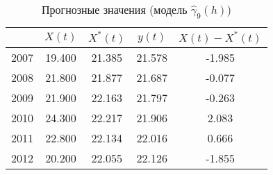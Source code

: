 \begin{table}[H]
\centering
\begin{tabular}{r|cccc}
  \hline
 & $X(t)$ & $X^{*}(t)$ & $y(t)$ & $ X(t) - X^{*}(t) $ \\ 
  \hline
2007 & 19.400 & 21.385 & 21.578 & -1.985 \\ 
  2008 & 21.800 & 21.877 & 21.687 & -0.077 \\ 
  2009 & 21.900 & 22.163 & 21.797 & -0.263 \\ 
  2010 & 24.300 & 22.217 & 21.906 & 2.083 \\ 
  2011 & 22.800 & 22.134 & 22.016 & 0.666 \\ 
  2012 & 20.200 & 22.055 & 22.126 & -1.855 \\ 
   \hline
\end{tabular}
\caption{Прогнозные значения (модель $ \widehat{\gamma}_9(h) $)} 
\label{table:auto-rob-5-prediction}
\end{table}
